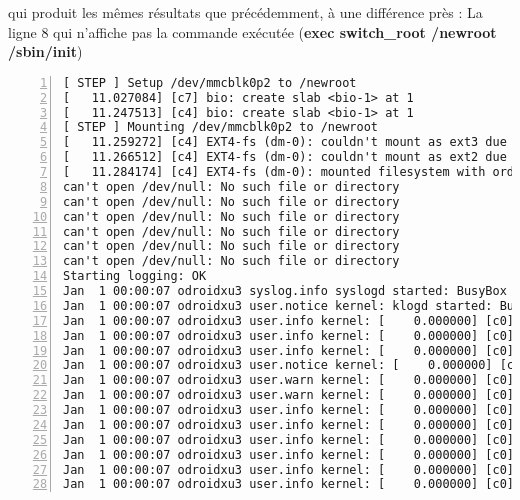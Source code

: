 qui produit les mêmes résultats que précédemment, à une différence près : La ligne 8 qui n'affiche pas la commande exécutée (\textbf{exec switch\_root /newroot /sbin/init})
\begin{lstlisting}[numbers=left]
[ STEP ] Setup /dev/mmcblk0p2 to /newroot
[   11.027084] [c7] bio: create slab <bio-1> at 1
[   11.247513] [c4] bio: create slab <bio-1> at 1
[ STEP ] Mounting /dev/mmcblk0p2 to /newroot
[   11.259272] [c4] EXT4-fs (dm-0): couldn't mount as ext3 due to feature incompatibilities
[   11.266512] [c4] EXT4-fs (dm-0): couldn't mount as ext2 due to feature incompatibilities
[   11.284174] [c4] EXT4-fs (dm-0): mounted filesystem with ordered data mode. Opts: (null)
can't open /dev/null: No such file or directory
can't open /dev/null: No such file or directory
can't open /dev/null: No such file or directory
can't open /dev/null: No such file or directory
can't open /dev/null: No such file or directory
can't open /dev/null: No such file or directory
Starting logging: OK
Jan  1 00:00:07 odroidxu3 syslog.info syslogd started: BusyBox v1.22.1
Jan  1 00:00:07 odroidxu3 user.notice kernel: klogd started: BusyBox v1.22.1 (2015-05-21 16:20:39 CEST)
Jan  1 00:00:07 odroidxu3 user.info kernel: [    0.000000] [c0] Booting Linux on physical CPU 0x100
Jan  1 00:00:07 odroidxu3 user.info kernel: [    0.000000] [c0] Initializing cgroup subsys cpu
Jan  1 00:00:07 odroidxu3 user.info kernel: [    0.000000] [c0] Initializing cgroup subsys cpuacct
Jan  1 00:00:07 odroidxu3 user.notice kernel: [    0.000000] [c0] Linux version 3.10.63 (embedhfw@experiment) (gcc version 4.9.2 20140904 (prerelease) (crosstool-NG linaro-1.13.1-4.9-2014.09 - Linaro GCC 4.9-5
Jan  1 00:00:07 odroidxu3 user.warn kernel: [    0.000000] [c0] CPU: ARMv7 Processor [410fc073] revision 3 (ARMv7), cr=10c5387d
Jan  1 00:00:07 odroidxu3 user.warn kernel: [    0.000000] [c0] CPU: PIPT / VIPT nonaliasing data cache, VIPT aliasing instruction cache
Jan  1 00:00:07 odroidxu3 user.info kernel: [    0.000000] [c0] Machine: ODROID-XU3, model: Hardkernel odroid-xu3 board based on EXYNOS5422
Jan  1 00:00:07 odroidxu3 user.info kernel: [    0.000000] [c0] ION: Contiguous 0x6650000 bytes @ 0x0 defined for 0:common
Jan  1 00:00:07 odroidxu3 user.info kernel: [    0.000000] [c0] ION: Contiguous 0x400000 bytes @ 0x0 defined for 2:mfc_sh
Jan  1 00:00:07 odroidxu3 user.info kernel: [    0.000000] [c0] ION: Contiguous 0x800000 bytes @ 0x0 defined for 10:g2d_wfd
Jan  1 00:00:07 odroidxu3 user.info kernel: [    0.000000] [c0] ION: Contiguous 0x6000000 bytes @ 0x0 defined for 11:video
Jan  1 00:00:07 odroidxu3 user.info kernel: [    0.000000] [c0] ION: Contiguous 0x1000000 bytes @ 0x0 defined for 7:mfc_input

\end{lstlisting}
